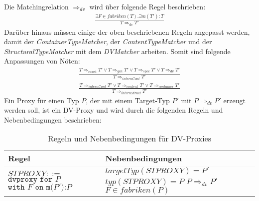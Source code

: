\documentclass[a4paper,12pt]{article}
\begin{document}
\noindent
Die Matchingrelation $\Rightarrow_{dv}$ wird über folgende Regel beschrieben:
\begin{gather*}
\frac{\exists F \in fabriken(T). \exists m(T'):T}{T \Rightarrow_{dv} T'}
\end{gather*}
Darüber hinaus müssen einige der oben beschriebenen Regeln angepasst werden, damit der \emph{ContainerTypeMatcher}, der \emph{ContentTypeMatcher} und der \emph{StructuralTypeMatcher} mit dem \emph{DVMatcher} arbeiten. Somit sind folgende Anpassungen von Nöten:
\begin{gather*}
\frac{T \Rightarrow_{exact} T' \vee T \Rightarrow_{gen} T' \vee
T \Rightarrow_{spec} T' \vee T \Rightarrow_{dv} T'  }{T \Rightarrow_{internCont} T'}
\end{gather*}
\begin{gather*}
\frac{T \Rightarrow_{internCont} T' \vee T \Rightarrow_{content} T' \vee
T \Rightarrow_{container} T'  }{T \Rightarrow_{internStruct} T'}
\end{gather*}
Ein Proxy für einen Typ $P$, der mit einem Target-Typ $P'$ mit $P \Rightarrow_{dv} P'$ erzeugt werden soll, ist ein DV-Proxy und wird durch die folgenden Regeln und Nebenbedingungen beschrieben:
\begin{table}[H]
\centering
\begin{tabular}{|p{6cm}|p{8cm}|}
\hline
\centering\textbf{Regel} & \textbf{Nebenbedingungen} \\
\hline
\hline
$\mathit{STPROXY} ::=$\newline 
$\texttt{dvproxy }  \texttt{for } P$\newline
$\texttt{with } F \texttt{ on } \texttt{m(}\mathit{P'}\texttt{):}\mathit{P}$ 
& 
$\mathit{targetTyp(STPROXY) = P'}$\newline
$\mathit{typ(STPROXY) = P}$\newline
$\mathit{P} \Rightarrow_{dv} \mathit{P'}$\newline
$\mathit{F} \in \mathit{fabriken(P)}$\\
\hline
\hline
\end{tabular}
\caption{Regeln und Nebenbedingungen für DV-Proxies}
 \label{tab:dvAttr}
\end{table}
\end{document}

